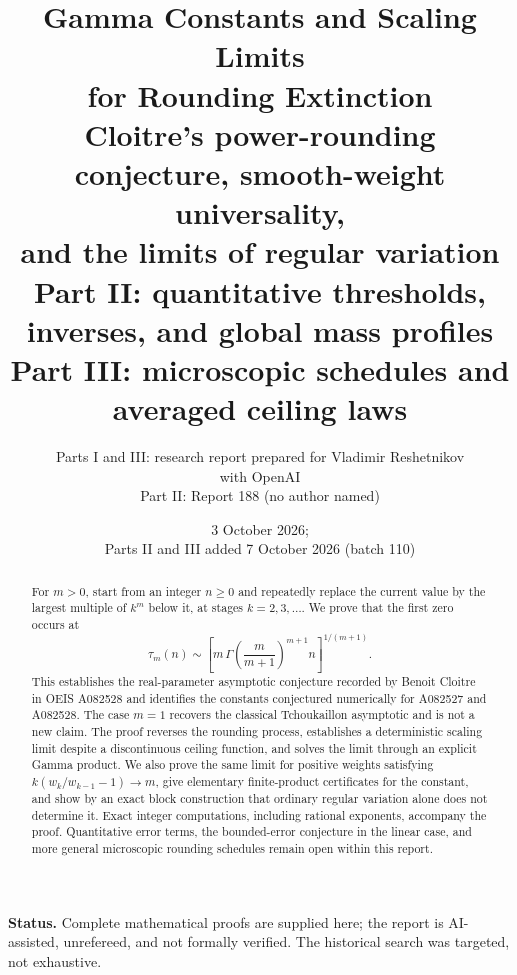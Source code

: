 \documentclass[11pt,a4paper]{article}
\title{\vspace{-1.2cm}\color{inkblue}\bfseries
 Gamma Constants and Scaling Limits\\[4pt]
 for Rounding Extinction\\[8pt]
 \large Cloitre's power-rounding conjecture, smooth-weight universality,\\
 and the limits of regular variation\\[6pt]
 \normalsize Part II: quantitative thresholds, inverses, and global mass profiles\\[2pt]
 \normalsize Part III: microscopic schedules and averaged ceiling laws}
\author{Parts I and III: research report prepared for Vladimir Reshetnikov\\
 \small with OpenAI\\[4pt]
 \normalsize Part II: Report 188 (no author named)}
\date{3 October 2026;\\ Parts II and III added 7 October 2026 (batch 110)}
\numberwithin{equation}{section}
\theoremstyle{definition}
\theoremstyle{remark}
\newcommand{\asym}{\mathrel{\sim}}
\begin{document}
\maketitle
\begin{abstract}
For $m>0$, start from an integer $n\geq0$ and repeatedly replace the current
value by the largest multiple of $k^m$ below it, at stages $k=2,3,\ldots$.
We prove that the first zero occurs at
\[
 \tau_m(n)\asym
 \left[m\,\Gamma\!\left(\frac{m}{m+1}\right)^{m+1}n\right]^{1/(m+1)}.
\]
This establishes the real-parameter asymptotic conjecture recorded by
Benoit Cloitre in OEIS A082528 and identifies the constants conjectured
numerically for A082527 and A082528. The case $m=1$ recovers the classical
Tchoukaillon asymptotic and is not a new claim.
The proof reverses the rounding process, establishes a deterministic
scaling limit despite a discontinuous ceiling function, and solves the
limit through an explicit Gamma product. We also prove the same limit
for positive weights satisfying $k(w_k/w_{k-1}-1)\to m$, give elementary
finite-product certificates for the constant, and show by an exact block
construction that ordinary regular variation alone does not determine it.
Exact integer computations, including rational exponents, accompany the
proof. Quantitative error terms, the bounded-error conjecture in the
linear case, and more general microscopic rounding schedules remain open
within this report.
\end{abstract}
\vspace{4pt}
\noindent\textbf{Status.} Complete mathematical proofs are supplied here;
the report is AI-assisted, unrefereed, and not formally verified.
The historical search was targeted, not exhaustive.
\end{document}
